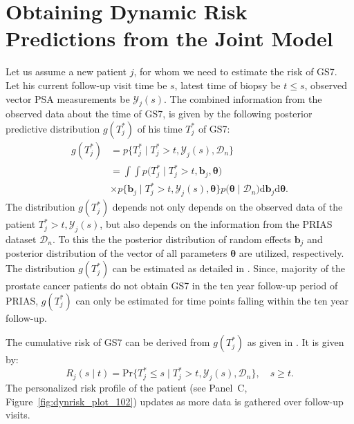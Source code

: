 \section{Obtaining Dynamic Risk Predictions from the Joint Model}
\label{sec:param_estimates_jm_fit_prias}
Let us assume a new patient $j$, for whom we need to estimate the risk of GS7. Let his current follow-up visit time be $s$, latest time of biopsy be $t\leq s$, observed vector PSA measurements be $\mathcal{Y}_{j}(s)$. The combined information from the observed data about the time of GS7, is given by the following posterior predictive distribution $g(T^*_j)$ of his time $T^*_j$ of GS7:
\begin{equation*}
\label{eq:post_pred_dist}
\begin{aligned}
g(T^*_j) &= p\big\{T^*_j \mid T^*_j > t, \mathcal{Y}_{j}(s), \mathcal{D}_n\big\}\\
&= \int \int p\big(T^*_j \mid T^*_j > t, \boldsymbol{b}_j, \boldsymbol{\theta}\big)\\
&\times p\big\{\boldsymbol{b}_j \mid T^*_j>t, \mathcal{Y}_{j}(s), \boldsymbol{\theta}\big\}p\big(\boldsymbol{\theta} \mid \mathcal{D}_n\big) \mathrm{d} \boldsymbol{b}_j \mathrm{d} \boldsymbol{\theta}.
\end{aligned}
\end{equation*}
The distribution $g(T^*_j)$ depends not only depends on the observed data of the patient $T^*_j > t, \mathcal{Y}_{j}(s)$, but also depends on the information from the PRIAS dataset $\mathcal{D}_n$. To this the the posterior distribution of random effects $\boldsymbol{b}_j$ and posterior distribution of the vector of all parameters $\boldsymbol{\theta}$ are utilized, respectively. The distribution $g(T^*_j)$ can be estimated as detailed in \citet{rizopoulos2017dynamic}. Since, majority of the prostate cancer patients do not obtain GS7 in the ten year follow-up period of PRIAS, $g(T^*_j)$ can only be estimated for time points falling within the ten year follow-up. 

The cumulative risk of GS7 can be derived from $g(T^*_j)$ as given in \citep{rizopoulos2017dynamic}. It is given by:
\begin{equation}
\label{eq:dynamic_risk_prob}
R_j(s \mid t) = \mbox{Pr}\big\{T^*_j \leq s \mid T^*_j > t, \mathcal{Y}_{j}(s), \mathcal{D}_n\big\}, \quad s \geq t.
\end{equation}
The personalized risk profile of the patient (see Panel~C, Figure~\ref{fig:dynrisk_plot_102}) updates as more data is gathered over follow-up visits. 

